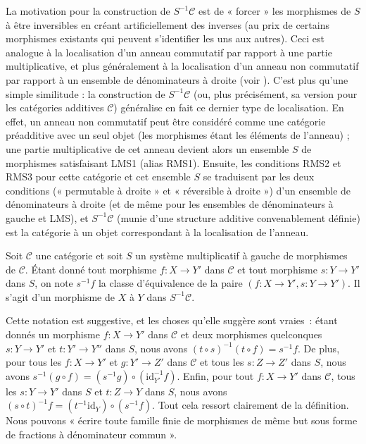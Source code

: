 \begin{remark}
\label{remark-motivation-localization}
La motivation pour la construction de $S^{-1} \mathcal{C}$ est de « forcer »
les morphismes de $S$ à être inversibles en créant artificiellement des
inverses (au prix de certains morphismes existants qui peuvent s'identifier les
uns aux autres). Ceci est analogue à la localisation d'un anneau commutatif
par rapport à une partie multiplicative, et plus généralement à la
localisation d'un anneau non commutatif par rapport à un ensemble de
dénominateurs à droite (voir \cite[section 10A]{Lam}). C'est plus qu'une simple
similitude : la construction de $S^{-1} \mathcal{C}$ (ou, plus précisément, sa
version pour les catégories additives $\mathcal{C}$) généralise en fait ce
dernier type de localisation. En effet, un anneau non commutatif peut être
considéré comme une catégorie préadditive avec un seul objet (les morphismes
étant les éléments de l'anneau) ; une partie multiplicative de cet anneau
devient alors un ensemble $S$ de morphismes satisfaisant LMS1 (alias RMS1).
Ensuite, les conditions RMS2 et RMS3 pour cette catégorie et cet ensemble
$S$ se traduisent par les deux conditions (« permutable à droite » et
« réversible à droite ») d'un ensemble de dénominateurs à droite (et de même
pour les ensembles de dénominateurs à gauche et LMS), et $S^{-1} \mathcal{C}$
(munie d'une structure additive convenablement définie) est la catégorie à un objet
correspondant à la localisation de l'anneau.
\end{remark}

\begin{definition}
\label{definition-left-localization-as-fraction}
Soit $\mathcal{C}$ une catégorie et soit $S$ un système multiplicatif à gauche
de morphismes de $\mathcal{C}$. Étant donné tout morphisme $f : X \to Y'$ dans
$\mathcal{C}$ et tout morphisme $s : Y \to Y'$ dans $S$, on note {\it $s^{-1} f$} la classe d'équivalence de la paire $(f : X \to Y', s : Y \to Y')$. Il
s'agit d'un morphisme de $X$ à $Y$ dans $S^{-1} \mathcal{C}$.
\end{definition}

\noindent
Cette notation est suggestive, et les choses qu'elle suggère sont vraies :
étant donnés un morphisme $f : X \to Y'$ dans $\mathcal{C}$ et deux
morphismes quelconques $s : Y \to Y'$ et $t : Y' \to Y''$ dans $S$, nous avons
$\left(t \circ s\right)^{-1} \left(t \circ f\right) = s^{-1} f$. De plus, pour
tous les $f : X \to Y'$ et $g : Y' \to Z'$ dans $\mathcal{C}$ et tous les $s : Z \to Z'$ dans $S$, nous avons $s^{-1} \left(g \circ f\right) = \left(s^{-1} g\right) \circ
\left(\text{id}_{Y'}^{-1} f\right)$. Enfin, pour tout $f : X \to Y'$ dans $\mathcal{C}$, tous les $s : Y \to Y'$ dans $S$ et $t : Z \to Y$
dans $S$, nous avons $\left(s \circ t\right)^{-1} f
= \left(t^{-1} \text{id}_Y\right)
\circ \left(s^{-1} f\right)$. Tout cela ressort clairement
de la définition. Nous pouvons « écrire toute famille finie de
morphismes de même but sous forme de fractions à dénominateur commun ».

